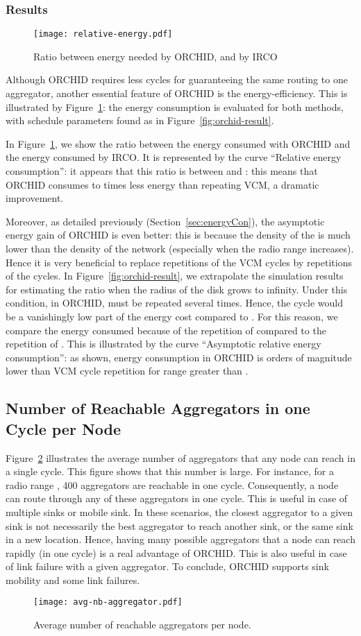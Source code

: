 \subsubsection{Results}
\begin{figure}[!h]
\centering
\texttt{[image: relative-energy.pdf]}\caption{Ratio between energy needed by ORCHID, and by IRCO}\label{fig:energy}
\end{figure}
Although ORCHID requires less cycles for guaranteeing the same routing to one aggregator, another essential feature of ORCHID is the energy-efficiency. This is illustrated by Figure~\ref{fig:energy}: the energy consumption is evaluated for both methods, with schedule parameters  found as in Figure~\ref{fig:orchid-result}. 

In Figure~\ref{fig:energy}, we show the ratio between the energy 
consumed with ORCHID and the energy consumed by IRCO. It is represented by the curve ``Relative energy consumption'': it appears that this ratio is between 
 and : this means that ORCHID consumes  to  times less
energy than repeating VCM, a dramatic improvement.

Moreover, as detailed previously (Section~\ref{sec:energyCon}), the asymptotic energy gain of ORCHID is 
even better: this is because the density of the  is much lower
than the density of the network (especially when the radio range increases).
Hence it is very beneficial to replace repetitions of the VCM cycles by
repetitions of the  cycles. In Figure~\ref{fig:orchid-result},
we extrapolate the simulation results for estimating the ratio when
the radius of the disk grows to infinity. Under this condition, in ORCHID,  must be repeated several times. Hence, the  cycle would be a vanishingly low part of the energy cost compared to . For this reason, we compare the energy consumed because of the repetition of  compared to the repetition of .
This is illustrated by the curve ``Asymptotic relative energy consumption'':
as shown, energy consumption in ORCHID is  orders of magnitude lower
than VCM cycle repetition for range greater than .





\subsection{Number of Reachable Aggregators in one Cycle per Node}\label{sec:reachAgg}
Figure~\ref{avgNbAgg} illustrates the average number of aggregators that any node can reach in a single cycle. 
This figure shows that this number is large. For instance, for a radio range , 400 aggregators are reachable in one cycle. Consequently, a node can route through any of these aggregators in one cycle. This is useful in case of multiple sinks or mobile sink. In these scenarios, the closest aggregator to a given sink is not necessarily the best aggregator to reach another sink, or the same sink in a new location. Hence, having many possible aggregators that a node can reach rapidly (in one cycle)    is a real advantage of ORCHID.
This is also useful in case of link failure with a given aggregator. To conclude, ORCHID supports sink mobility and some link failures. 


\begin{figure}[h!]
\centering
\texttt{[image: avg-nb-aggregator.pdf]}
\caption{Average number of reachable aggregators per node.
\label{avgNbAgg}}
\end{figure} 
